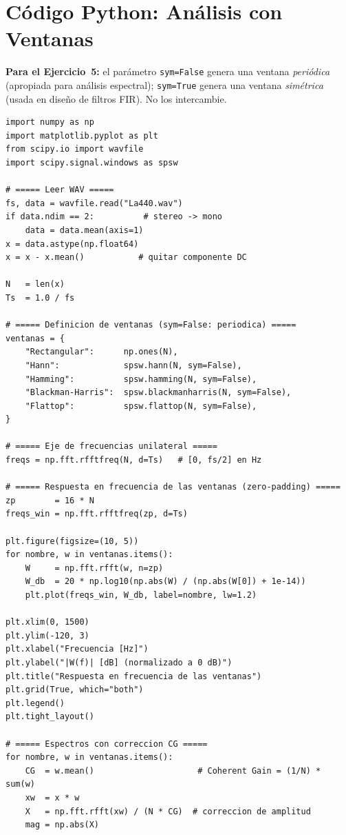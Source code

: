 \documentclass[11pt, a4paper]{article}
\begin{document}
\section{C\'odigo Python: An\'alisis con Ventanas}

\begin{hintbox}
\textbf{Para el Ejercicio~5:} el par\'ametro \texttt{sym=False} genera una ventana
\emph{peri\'odica} (apropiada para an\'alisis espectral); \texttt{sym=True} genera
una ventana \emph{sim\'etrica} (usada en dise\~no de filtros FIR).
No los intercambie.
\end{hintbox}

\begin{lstlisting}[style=pythonstyle, caption={ventanas\_analisis.py}]
import numpy as np
import matplotlib.pyplot as plt
from scipy.io import wavfile
import scipy.signal.windows as spsw

# ===== Leer WAV =====
fs, data = wavfile.read("La440.wav")
if data.ndim == 2:          # stereo -> mono
    data = data.mean(axis=1)
x = data.astype(np.float64)
x = x - x.mean()           # quitar componente DC

N   = len(x)
Ts  = 1.0 / fs

# ===== Definicion de ventanas (sym=False: periodica) =====
ventanas = {
    "Rectangular":      np.ones(N),
    "Hann":             spsw.hann(N, sym=False),
    "Hamming":          spsw.hamming(N, sym=False),
    "Blackman-Harris":  spsw.blackmanharris(N, sym=False),
    "Flattop":          spsw.flattop(N, sym=False),
}

# ===== Eje de frecuencias unilateral =====
freqs = np.fft.rfftfreq(N, d=Ts)   # [0, fs/2] en Hz

# ===== Respuesta en frecuencia de las ventanas (zero-padding) =====
zp        = 16 * N
freqs_win = np.fft.rfftfreq(zp, d=Ts)

plt.figure(figsize=(10, 5))
for nombre, w in ventanas.items():
    W     = np.fft.rfft(w, n=zp)
    W_db  = 20 * np.log10(np.abs(W) / (np.abs(W[0]) + 1e-14))
    plt.plot(freqs_win, W_db, label=nombre, lw=1.2)

plt.xlim(0, 1500)
plt.ylim(-120, 3)
plt.xlabel("Frecuencia [Hz]")
plt.ylabel("|W(f)| [dB] (normalizado a 0 dB)")
plt.title("Respuesta en frecuencia de las ventanas")
plt.grid(True, which="both")
plt.legend()
plt.tight_layout()

# ===== Espectros con correccion CG =====
for nombre, w in ventanas.items():
    CG  = w.mean()                     # Coherent Gain = (1/N) * sum(w)
    xw  = x * w
    X   = np.fft.rfft(xw) / (N * CG)  # correccion de amplitud
    mag = np.abs(X)


\end{lstlisting}
\end{document}

